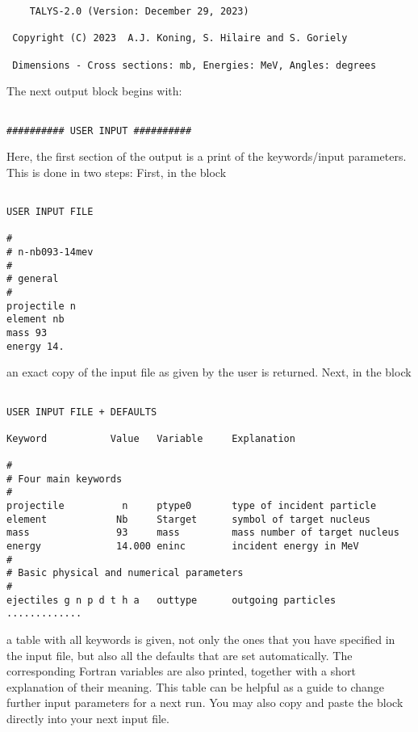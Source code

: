 \begin{samplecase}
{\begin{verbatim}
    TALYS-2.0 (Version: December 29, 2023)

 Copyright (C) 2023  A.J. Koning, S. Hilaire and S. Goriely

 Dimensions - Cross sections: mb, Energies: MeV, Angles: degrees
\end{verbatim} } \renewcommand{\baselinestretch}{1.07}\small\normalsize
\noindent
The next output block begins with:

{\small \begin{verbatim}

########## USER INPUT ##########
\end{verbatim} } \renewcommand{\baselinestretch}{1.07}\small\normalsize
\noindent
Here, the first section of the output is a print of the keywords/input 
parameters. This is done in two steps: First, in the block

{\small \begin{verbatim}

USER INPUT FILE

#
# n-nb093-14mev
#
# general
#
projectile n
element nb
mass 93
energy 14.
\end{verbatim} } \renewcommand{\baselinestretch}{1.07}\small\normalsize
\noindent
an exact copy of the input file as given by the user is returned. Next, in
the block

{\small \begin{verbatim}

USER INPUT FILE + DEFAULTS

Keyword           Value   Variable     Explanation

#
# Four main keywords
#
projectile          n     ptype0       type of incident particle
element            Nb     Starget      symbol of target nucleus
mass               93     mass         mass number of target nucleus
energy             14.000 eninc        incident energy in MeV
#
# Basic physical and numerical parameters
#
ejectiles g n p d t h a   outtype      outgoing particles
.............
\end{verbatim} } \renewcommand{\baselinestretch}{1.07}\small\normalsize
\noindent
a table with all keywords is given, 
not only the ones that you have specified in the input file, but also all the 
defaults that are set automatically. The corresponding Fortran variables are 
also printed, together with a short explanation of their meaning. This table 
can be helpful as a guide to change further input parameters for a next run. 
You may also copy and paste the block directly into your next input file.


\end{samplecase}
